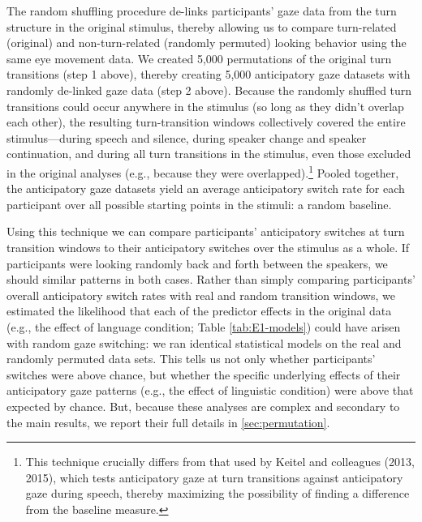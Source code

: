 \documentclass[authoryear, 12pt]{elsarticle}
\begin{document}
The random shuffling procedure de-links participants' gaze data from the turn structure in the original stimulus, thereby allowing us to compare turn-related (original) and non-turn-related (randomly permuted) looking behavior using the same eye movement data. We created 5,000 permutations of the original turn transitions (step 1 above), thereby creating 5,000 anticipatory gaze datasets with randomly de-linked gaze data (step 2 above). Because the randomly shuffled turn transitions could occur anywhere in the stimulus (so long as they didn't overlap each other), the resulting turn-transition windows collectively covered the entire stimulus---during speech and silence, during speaker change and speaker continuation, and during all turn transitions in the stimulus, even those excluded in the original analyses (e.g., because they were overlapped).\footnote{This technique crucially differs from that used by Keitel and colleagues (2013, 2015), which tests anticipatory gaze at turn transitions against anticipatory gaze during speech, thereby maximizing the possibility of finding a difference from the baseline measure.} Pooled together, the anticipatory gaze datasets yield an average anticipatory switch rate for each participant over all possible starting points in the stimuli: a random baseline.

Using this technique we can compare participants' anticipatory switches at turn transition windows to their anticipatory switches over the stimulus as a whole. If participants were looking randomly back and forth between the speakers, we should similar patterns in both cases. Rather than simply comparing participants' overall anticipatory switch rates with real and random transition windows, we estimated the likelihood that each of the predictor effects in the original data (e.g., the effect of language condition; Table \ref{tab:E1-models}) could have arisen with random gaze switching: we ran identical statistical models on the real and randomly permuted data sets. This tells us not only whether participants' switches were above chance, but whether the specific underlying effects of their anticipatory gaze patterns (e.g., the effect of linguistic condition) were above that expected by chance. But, because these analyses are complex and secondary to the main results, we report their full details in \ref{sec:permutation}.
\end{document}
